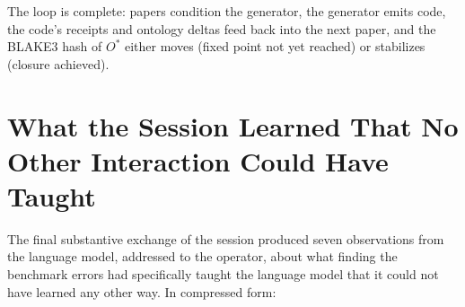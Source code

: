 \documentclass[11pt,letterpaper]{article}
\begin{document}
The loop is complete: papers condition the generator, the generator emits code, the code's receipts and ontology deltas feed back into the next paper, and the BLAKE3 hash of $O^{\ast}$ either moves (fixed point not yet reached) or stabilizes (closure achieved).

\section{What the Session Learned That No Other Interaction Could Have Taught}

The final substantive exchange of the session produced seven observations from the language model, addressed to the operator, about what finding the benchmark errors had specifically taught the language model that it could not have learned any other way. In compressed form:
\end{document}

